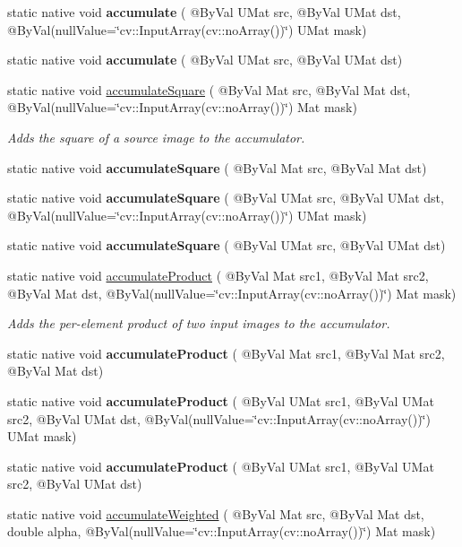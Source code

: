 \begin{DoxyCompactItemize}
static native void {\bfseries accumulate} ( @By\+Val U\+Mat src, @By\+Val U\+Mat dst, @By\+Val(null\+Value=\char`\"{}cv\+::\+Input\+Array(cv\+::no\+Array())\char`\"{}) U\+Mat mask)
\item 
static native void {\bfseries accumulate} ( @By\+Val U\+Mat src, @By\+Val U\+Mat dst)
\item 
static native void \hyperlink{group__imgproc__motion_ga84b3439df65475bcccdee5cd99171da8}{accumulate\+Square} ( @By\+Val Mat src, @By\+Val Mat dst, @By\+Val(null\+Value=\char`\"{}cv\+::\+Input\+Array(cv\+::no\+Array())\char`\"{}) Mat mask)
\begin{DoxyCompactList}\small\item\em Adds the square of a source image to the accumulator. \end{DoxyCompactList}\item 
static native void {\bfseries accumulate\+Square} ( @By\+Val Mat src, @By\+Val Mat dst)
\item 
static native void {\bfseries accumulate\+Square} ( @By\+Val U\+Mat src, @By\+Val U\+Mat dst, @By\+Val(null\+Value=\char`\"{}cv\+::\+Input\+Array(cv\+::no\+Array())\char`\"{}) U\+Mat mask)
\item 
static native void {\bfseries accumulate\+Square} ( @By\+Val U\+Mat src, @By\+Val U\+Mat dst)
\item 
static native void \hyperlink{group__imgproc__motion_ga651a79607dc72d0697ca3dc5df6e9033}{accumulate\+Product} ( @By\+Val Mat src1, @By\+Val Mat src2, @By\+Val Mat dst, @By\+Val(null\+Value=\char`\"{}cv\+::\+Input\+Array(cv\+::no\+Array())\char`\"{}) Mat mask)
\begin{DoxyCompactList}\small\item\em Adds the per-\/element product of two input images to the accumulator. \end{DoxyCompactList}\item 
static native void {\bfseries accumulate\+Product} ( @By\+Val Mat src1, @By\+Val Mat src2, @By\+Val Mat dst)
\item 
static native void {\bfseries accumulate\+Product} ( @By\+Val U\+Mat src1, @By\+Val U\+Mat src2, @By\+Val U\+Mat dst, @By\+Val(null\+Value=\char`\"{}cv\+::\+Input\+Array(cv\+::no\+Array())\char`\"{}) U\+Mat mask)
\item 
static native void {\bfseries accumulate\+Product} ( @By\+Val U\+Mat src1, @By\+Val U\+Mat src2, @By\+Val U\+Mat dst)
\item 
static native void \hyperlink{group__imgproc__motion_gaa66187536d891c9d8ceacafa73d2d247}{accumulate\+Weighted} ( @By\+Val Mat src, @By\+Val Mat dst, double alpha, @By\+Val(null\+Value=\char`\"{}cv\+::\+Input\+Array(cv\+::no\+Array())\char`\"{}) Mat mask)

\end{DoxyCompactItemize}
